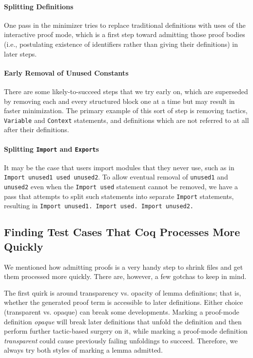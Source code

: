 \documentclass[a4paper,USenglish,cleveref,autoref,thm-restate]{lipics-v2021}
\begin{document}
\paragraph{Splitting Definitions}
One pass in the minimizer tries to replace traditional definitions with uses of the interactive proof mode, which is a first step toward admitting those proof bodies (i.e., postulating existence of identifiers rather than giving their definitions) in later steps.

\paragraph{Early Removal of Unused Constants}
There are some likely-to-succeed steps that we try early on, which are superseded by removing each and every structured block one at a time but may result in faster minimization.
The primary example of this sort of step is removing tactics, \verb|Variable| and \verb|Context| statements, and definitions which are not referred to at all after their definitions.

\paragraph{Splitting \texttt{Import} and \texttt{Export}s}
It may be the case that users import modules that they never use, such as in \texttt{Import unused1 used unused2}.
To allow eventual removal of \verb|unused1| and \verb|unused2| even when the \verb|Import used| statement cannot be removed, we have a pass that attempts to split such statements into separate \verb|Import| statements, resulting in \texttt{Import unused1. Import used. Import unused2.}

\subsection{Finding Test Cases That Coq Processes More Quickly}

We mentioned how admitting proofs is a very handy step to shrink files and get them processed more quickly.
There are, however, a few gotchas to keep in mind.

The first quirk is around transparency vs. opacity of lemma definitions; that is, whether the generated proof term is accessible to later definitions.
Either choice (transparent vs. opaque) can break some developments.
Marking a proof-mode definition \emph{opaque} will break later definitions that unfold the definition and then perform further tactic-based surgery on it, while marking a proof-mode definition \emph{transparent} could cause previously failing unfoldings to succeed.
Therefore, we always try both styles of marking a lemma admitted.
\end{document}
